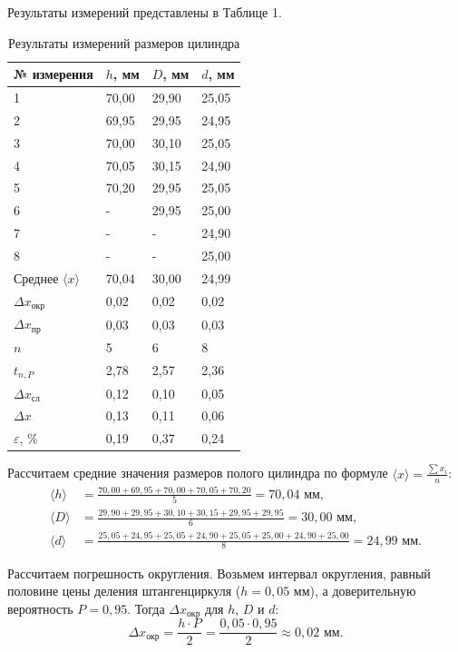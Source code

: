 Результаты измерений представлены в Таблице 1.

\begin{table}[h!]
	\centering
	\caption{Результаты измерений размеров цилиндра}
	\begin{tabular}{@{}llll@{}}
		\toprule
		№ измерения & $h$, мм & $D$, мм & $d$, мм \\ \midrule
		1 & 70,00 & 29,90 & 25,05 \\
		2 & 69,95 & 29,95 & 24,95 \\
		3 & 70,00 & 30,10 & 25,05 \\
		4 & 70,05 & 30,15 & 24,90 \\
		5 & 70,20 & 29,95 & 25,05 \\
		6 & -     & 29,95 & 25,00 \\
		7 & -     & -     & 24,90 \\
		8 & -     & -     & 25,00 \\ \midrule
		Среднее $\langle x \rangle$ & 70,04 & 30,00 & 24,99 \\
		$\Delta x_{окр}$ & 0,02 & 0,02 & 0,02 \\
		$\Delta x_{пр}$ & 0,03 & 0,03 & 0,03 \\
		$n$ & 5 & 6 & 8 \\
		$t_{n,P}$ & 2,78 & 2,57 & 2,36 \\
		$\Delta x_{сл}$ & 0,12 & 0,10 & 0,05 \\
		$\Delta x$ & 0,13 & 0,11 & 0,06 \\
		$\varepsilon$, \% & 0,19 & 0,37 & 0,24 \\ \bottomrule
	\end{tabular}
\end{table}

Рассчитаем средние значения размеров полого цилиндра по формуле $\langle x \rangle = \frac{\sum x_i}{n}$:
\begin{align*}
	\langle h \rangle &= \frac{70,00 + 69,95 + 70,00 + 70,05 + 70,20}{5} = 70,04 \text{ мм}, \\
	\langle D \rangle &= \frac{29,90 + 29,95 + 30,10 + 30,15 + 29,95 + 29,95}{6} = 30,00 \text{ мм}, \\
	\langle d \rangle &= \frac{25,05 + 24,95 + 25,05 + 24,90 + 25,05 + 25,00 + 24,90 + 25,00}{8} = 24,99 \text{ мм}.
\end{align*}

Рассчитаем погрешность округления. Возьмем интервал округления, равный половине цены деления штангенциркуля ($h = 0,05$ мм), а доверительную вероятность $P = 0,95$. Тогда $\Delta x_{окр}$ для $h$, $D$ и $d$:
$$ \Delta x_{окр} = \frac{h \cdot P}{2} = \frac{0,05 \cdot 0,95}{2} \approx 0,02 \text{ мм}. $$

